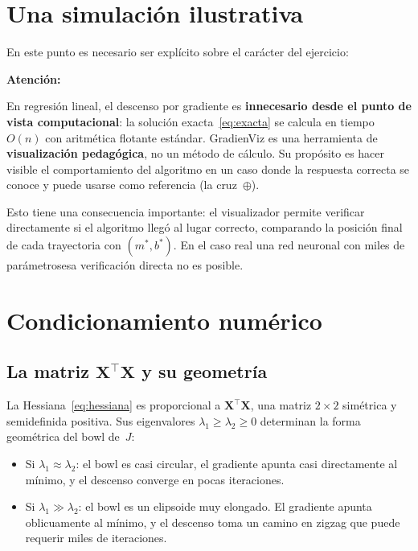 \documentclass[12pt, a4paper]{article}
\newenvironment{vizadv}{%
  \begin{mdframed}[style=viznaranja]
  \textbf{\color{bordeadv}Atención:}\quad
}{%
  \end{mdframed}
}
\newcommand{\mstar}{m^{*}}
\newcommand{\bstar}{b^{*}}
\newcommand{\XtX}{\mathbf{X}^{\top}\mathbf{X}}
\begin{document}
\section{Una simulación ilustrativa}

En este punto es necesario ser explícito sobre el carácter del ejercicio:

\begin{vizadv}
  En regresión lineal, el descenso por gradiente es \textbf{innecesario
  desde el punto de vista computacional}: la solución exacta~\eqref{eq:exacta}
  se calcula en tiempo $O(n)$ con aritmética flotante estándar.
  GradienViz es una herramienta de \textbf{visualización pedagógica}, no
  un método de cálculo. Su propósito es hacer visible el comportamiento
  del algoritmo en un caso donde la respuesta correcta se conoce y puede
  usarse como referencia (la cruz~$\oplus$).
\end{vizadv}

Esto tiene una consecuencia importante: el visualizador permite verificar
directamente si el algoritmo llegó al lugar correcto, comparando la posición
final de cada trayectoria con $(\mstar, \bstar)$. En el caso real\textemdash
una red neuronal con miles de parámetros\textemdash esa verificación directa
no es posible.

\section{Condicionamiento numérico}

\subsection{La matriz \texorpdfstring{$\XtX$}{X'X} y su geometría}

La Hessiana~\eqref{eq:hessiana} es proporcional a $\XtX$, una matriz $2\times 2$
simétrica y semidefinida positiva. Sus eigenvalores $\lambda_1 \geq \lambda_2 \geq 0$
determinan la forma geométrica del bowl de~$J$:

\begin{itemize}
  \item Si $\lambda_1 \approx \lambda_2$: el bowl es casi circular, el gradiente
    apunta casi directamente al mínimo, y el descenso converge en pocas iteraciones.
  \item Si $\lambda_1 \gg \lambda_2$: el bowl es un elipsoide muy elongado.
    El gradiente apunta oblicuamente al mínimo, y el descenso toma un camino
    en zigzag que puede requerir miles de iteraciones.
\end{itemize}
\end{document}
